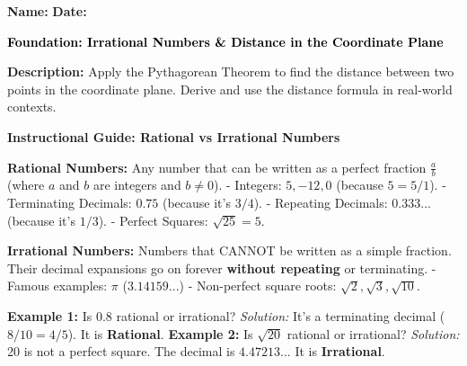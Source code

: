 \documentclass[12pt, letterpaper, fleqn]{article}
\begin{document}
\textbf{Name:} \underline{\hspace{5cm}}
\hfill
\textbf{Date:} \underline{\hspace{3cm}}\\

\begin{tcolorbox}[colback=customteal!20]
    \large\textcolor{black}{\textbf{Foundation: Irrational Numbers & Distance in the Coordinate Plane}}
\end{tcolorbox}

\vspace{3mm}

\noindent
\textbf{Description:} Apply the Pythagorean Theorem to find the distance between two points in the coordinate plane. Derive and use the distance formula in real-world contexts.

\vspace{4mm}


\begin{tcolorbox}[colback=white, colframe=black!25, boxrule=0.6pt, arc=4mm, left=6mm, right=6mm, top=5mm, bottom=5mm]
\textbf{Instructional Guide: Rational vs Irrational Numbers}

\medskip
\textbf{Rational Numbers:} Any number that can be written as a perfect fraction $\frac{a}{b}$ (where $a$ and $b$ are integers and $b \neq 0$).
- Integers: $5, -12, 0$ (because $5 = 5/1$).
- Terminating Decimals: $0.75$ (because it's $3/4$).
- Repeating Decimals: $0.333...$ (because it's $1/3$).
- Perfect Squares: $\sqrt{25} = 5$.

\textbf{Irrational Numbers:} Numbers that CANNOT be written as a simple fraction. Their decimal expansions go on forever \textbf{without repeating} or terminating.
- Famous examples: $\pi$ ($3.14159...$)
- Non-perfect square roots: $\sqrt{2}, \sqrt{3}, \sqrt{10}$.

\vspace{2mm}
\textbf{Example 1:} Is $0.8$ rational or irrational?
\textit{Solution:} It's a terminating decimal ($8/10 = 4/5$). It is \textbf{Rational}.
\textbf{Example 2:} Is $\sqrt{20}$ rational or irrational?
\textit{Solution:} 20 is not a perfect square. The decimal is $4.47213...$ It is \textbf{Irrational}.
\end{tcolorbox}

\vspace{4mm}
\end{document}
